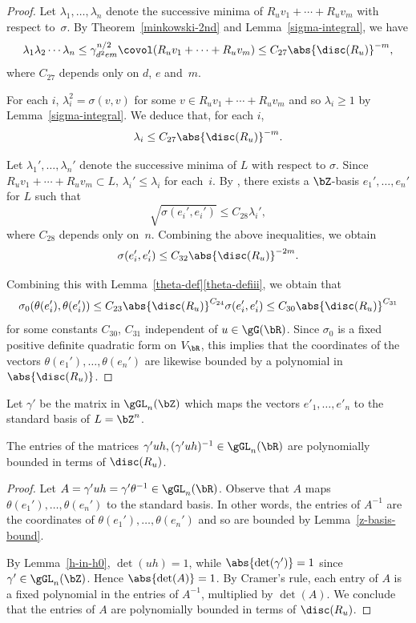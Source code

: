 \begin{proof}
Let $\lambda_1, \dotsc, \lambda_n$ denote the successive minima of $R_u v_1 + \dotsb + R_u v_m$ with respect to~$\sigma$.
By Theorem~\ref{minkowski-2nd} and Lemma~\ref{sigma-integral}, we have
\[
\lambda_1 \lambda_2 \dotsm \lambda_n
\leq \gamma_{d^2em}^{n/2} \covol(R_u v_1 + \dotsb + R_u v_m)
\leq C_{27} \abs{\disc(R_u)}^{-m},
\]
where $C_{27}$ depends only on $d$, $e$ and~$m$.

For each $i$, $\lambda_i^2 = \sigma(v,v)$ for some $v \in R_u v_1 + \dotsb + R_u v_m$ and so $\lambda_i \geq 1$ by Lemma~\ref{sigma-integral}.
We deduce that, for each $i$,
\[
\lambda_i \leq C_{27} \abs{\disc(R_u)}^{-m}.
\]

Let $\lambda_1', \dotsc, \lambda_n'$ denote the successive minima of $L$ with respect to $\sigma$.
Since $R_u v_1 + \dotsb + R_u v_m \subset L$, $\lambda_i' \leq \lambda_i$ for each~$i$.
By \cite[Th.\,4]{Wey40}, there exists a $\bZ$-basis $e_1', \dotsc, e_n'$ for $L$ such that
\[
\sqrt{\sigma(e_i', e_i')} \leq C_{28} \lambda_i',
\]
where $C_{28}$ depends only on~$n$.
Combining the above inequalities, we obtain
\begin{equation*}
\sigma(e_i', e_i') \leq C_{32} \abs{\disc(R_u)}^{-2m}.
\end{equation*}

Combining this with Lemma~\ref{theta-def}\eqref{theta-defiii}, we obtain that
\[
\sigma_0(\theta(e_i'), \theta(e_i'))
\leq C_{23} \abs{\disc(R_u)}^{C_{24}} \sigma(e_i', e_i')
\leq C_{30} \abs{\disc(R_u)}^{C_{31}}
\]
for some constants $C_{30}$, $C_{31}$ independent of $u \in \gG(\bR)$.
Since $\sigma_0$ is a fixed positive definite quadratic form on $V_\bR$, this implies that the coordinates of the vectors $\theta(e_1'), \dotsc, \theta(e_n')$ are likewise bounded by a polynomial in $\abs{\disc(R_u)}$.
\end{proof}

Let $\gamma'$ be the matrix in $\gGL_n(\bZ)$ which maps the vectors $e'_1, \dotsc, e'_n$ to the standard basis of $L = \bZ^n$.

\begin{lemma} \label{entries'-bound}
The entries of the matrices $\gamma' uh, (\gamma' uh)^{-1} \in \gGL_n(\bR)$ are polynomially bounded in terms of $\disc(R_u)$.
\end{lemma}

\begin{proof}
Let $A = \gamma' uh = \gamma' \theta^{-1} \in \gGL_n(\bR)$.
Observe that $A$ maps $\theta(e_1'), \dotsc, \theta(e_n')$ to the standard basis.
In other words, the entries of $A^{-1}$ are the coordinates of $\theta(e_1'), \dotsc, \theta(e_n')$ and so are bounded by Lemma~\ref{z-basis-bound}.

By Lemma~\ref{h-in-h0}, $\det(uh)=1$, while $\abs{\det(\gamma')} = 1$ since $\gamma' \in \gGL_n(\bZ)$.
Hence $\abs{\det(A)}=1$.
By Cramer's rule, each entry of $A$ is a fixed polynomial in the entries of $A^{-1}$, multiplied by $\det(A)$.
We conclude that the entries of $A$ are polynomially bounded in terms of $\disc(R_u)$.
\end{proof}

